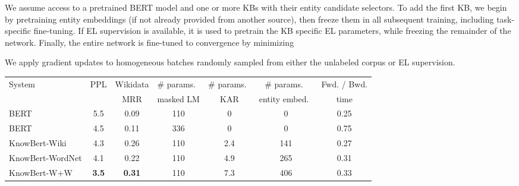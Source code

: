 \documentclass[11pt,a4paper]{article}
\newcommand{\KB}[0]{KnowBert}
\newcommand{\KBS}[0]{KnowBert }
\newcommand{\KWIKI}[0]{KnowBert-Wiki}
\newcommand{\KWORDNET}[0]{KnowBert-WordNet}
\newcommand{\KWANDW}[0]{KnowBert-W+W}
\newcommand{\BBS}[0]{BERT }
\newcommand{\BLS}[0]{BERT }
\begin{document}
\begin{algorithm}[!t]
\SetAlgoLined
\SetArgSty{}
\DontPrintSemicolon
{}
\KwOut{\KB}
 \caption{\KBS training method}
 \label{alg:training}
\end{algorithm}


We assume access to a pretrained BERT model and one or more KBs with their entity candidate selectors.
To add the first KB, we begin by pretraining entity embeddings (if not already provided from another source), then freeze them in all subsequent training, including task-specific fine-tuning.
If EL supervision is available, it is used to pretrain the KB specific EL parameters, while freezing the remainder of the network.
Finally, the entire network is fine-tuned to convergence by minimizing

We apply gradient updates to homogeneous batches randomly sampled from either the unlabeled corpus or EL supervision.

\begin{table*}[th]
\centering
\begin{tabular}{l c c c c c c}
\toprule
\multirow{2}{*}{System} & \multirow{2}{*}{PPL} & Wikidata & \# params.\ & \# params.\ & \# params.\ & Fwd. / Bwd. \\
                  &   & MRR   & masked LM & KAR & entity embed.\ & time \\
 \midrule
 \BBS & 5.5 & 0.09 & 110 & 0 & 0 & 0.25 \\
 \BLS & 4.5 & 0.11 & 336 & 0 & 0 & 0.75 \\
 \KWIKI & 4.3 & 0.26 & 110 & 2.4 & 141 & 0.27 \\
\KWORDNET & 4.1 & 0.22 & 110 & 4.9 & 265 & 0.31 \\
\KWANDW & \textbf{3.5} & \textbf{0.31} & 110 & 7.3 & 406 & 0.33 \\
\bottomrule
\end{tabular}\caption{Comparison of masked LM perplexity, Wikidata probing MRR, and number of parameters (in millions) in the masked LM (word piece embeddings, transformer layers, and output layers), KAR, and entity embeddings for BERT and \KB.  The table also includes the total time to run one forward and backward pass (in seconds) on a TITAN Xp GPU (12 GB RAM) for a batch of 32 sentence pairs with total length 80 word pieces.  Due to memory constraints, the \BLS batch is accumulated over two smaller batches.
}
\label{tab:perplexity}
\end{table*}
\end{document}
